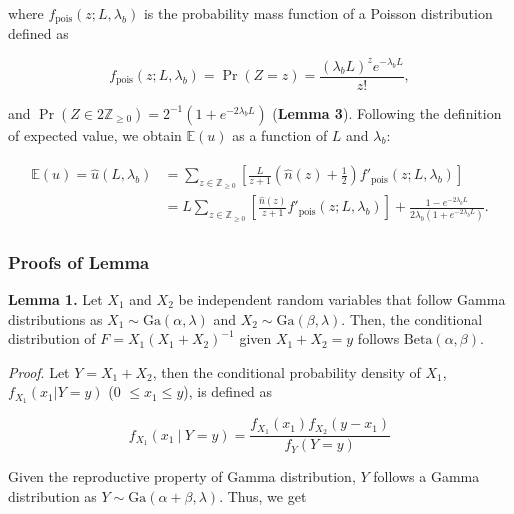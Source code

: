 \documentclass[11pt, class=article, crop=false]{standalone}
\begin{document}
where $f_{\text{pois}}(z; L, \lambda_b)$ is the probability mass function of a Poisson distribution defined as

\begin{equation}
    f_{\text{pois}}(z; L, \lambda_b) = \Pr(Z = z) = \frac{(\lambda_b L)^{z} e^{-\lambda_b L}}{z!},
\end{equation}

and $\Pr(Z \in 2\mathbb{Z}_{\ge 0}) = 2^{-1}(1 + e^{- 2 \lambda_b L})$ (\textbf{Lemma 3}). 
Following the definition of expected value, we obtain $\mathbb{E}(u)$ as a function of $L$ and $\lambda_b$:

\begin{align}
    \begin{split}
        \mathbb{E}(u) = \hat{u}(L, \lambda_b) 
                    &= \sum_{z \in \mathbb{Z}_{\ge 0}} \left[ \frac{L}{z + 1} \left(\hat{n}(z) + \frac{1}{2}\right) f'_{\text{pois}}(z; L, \lambda_b) \right]\\
                    &= L \sum_{z \in \mathbb{Z}_{\ge 0}} \left[ \frac{\hat{n}(z)}{z + 1} f'_{\text{pois}}(z; L, \lambda_b)\right] + 
                    \frac{1 - e^{-2 \lambda_b L}}{2 \lambda_b (1 + e^{-2 \lambda_b L})}.
    \end{split}
\end{align}

\subsubsection{Proofs of Lemma}

\textbf{Lemma 1.}
Let $X_1$ and $X_2$ be independent random variables that follow Gamma distributions as $X_1 \sim \mbox{Ga}(\alpha, \lambda)$ and $X_2 \sim \mbox{Ga}(\beta, \lambda)$.
Then, the conditional distribution of $F = X_1(X_1 + X_2)^{-1}$ given $X_1 + X_2 = y$ follows $\mbox{Beta}(\alpha, \beta)$.

\textit{Proof}.
Let $Y = X_1 + X_2$, then the conditional probability density of $X_1$, $f_{X_1}(x_1 | Y = y)$ (0 $\le x_1 \le y$), is defined as

\begin{equation}
    f_{X_1}(x_1~|~Y = y) = \frac{f_{X_1}(x_1) f_{X_2}(y - x_1)}{f_{Y}(Y = y)}
\end{equation}

Given the reproductive property of Gamma distribution, $Y$ follows a Gamma distribution as $Y \sim \mbox{Ga}(\alpha + \beta, \lambda)$.
Thus, we get
\end{document}
